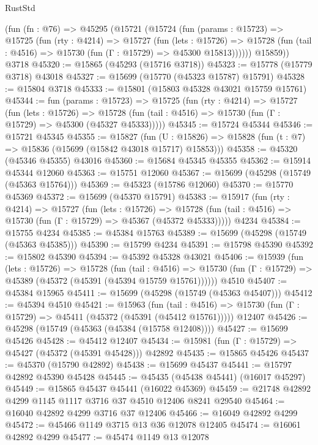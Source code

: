 \begin{lexlean}{RustStd}
\begin{coremodule}
    (fun (fn : @76) =>
    @45295
      (@15721
        (@15724
          (fun (params : @15723) =>
          @15725
            (fun (rty : @4214) =>
            @15727
              (fun (lets : @15726) =>
              @15728 (fun (tail : @4516) => @15730 (fun (Γ : @15729) => @45300 @15813))))))
        @15859))
    @3718
@45320 := @15865 (@45293 (@15716 @3718))
@45323 := @15778 (@15779 @3718) @43018
@45327 := @15699 (@15770 (@45323 @15787) @15791)
@45328 := @15804 @3718
@45333 := @15801 (@15803 @45328 @43021 @15759 @15761)
@45344 := fun (params : @15723) =>
  @15725
    (fun (rty : @4214) =>
    @15727
      (fun (lets : @15726) =>
      @15728 (fun (tail : @4516) => @15730 (fun (Γ : @15729) => @45300 (@45327 @45333)))))
@45345 := @15724 @45344
@45346 := @15721 @45345
@45355 := @15827
    (fun (U : @15826) => @15828 (fun (t : @7) => @15836 (@15699 (@15842 @43018 @15717) @15853)))
@45358 := @45320 (@45346 @45355) @43016
@45360 := @15684 @45345 @45355
@45362 := @15914 @45344 @12060
@45363 := @15751 @12060
@45367 := @15699 (@45298 (@15749 (@45363 @15764)))
@45369 := @45323 (@15786 @12060)
@45370 := @15770 @45369
@45372 := @15699 (@45370 @15791)
@45383 := @15917
    (fun (rty : @4214) =>
    @15727
      (fun (lets : @15726) =>
      @15728 (fun (tail : @4516) => @15730 (fun (Γ : @15729) => @45367 (@45372 @45333)))))
    @4234
@45384 := @15755 @4234
@45385 := @45384 @15763
@45389 := @15699 (@45298 (@15749 (@45363 @45385)))
@45390 := @15799 @4234
@45391 := @15798 @45390
@45392 := @15802 @45390
@45394 := @45392 @45328 @43021
@45406 := @15939
    (fun (lets : @15726) =>
    @15728
      (fun (tail : @4516) =>
      @15730 (fun (Γ : @15729) => @45389 (@45372 (@45391 (@45394 @15759 @15761))))))
    @4510
@45407 := @45384 @15965
@45411 := @15699 (@45298 (@15749 (@45363 @45407)))
@45412 := @45394 @4510
@45421 := @15963
    (fun (tail : @4516) => @15730 (fun (Γ : @15729) => @45411 (@45372 (@45391 (@45412 @15761)))))
    @12407
@45426 := @45298 (@15749 (@45363 (@45384 (@15758 @12408))))
@45427 := @15699 @45426
@45428 := @45412 @12407
@45434 := @15981 (fun (Γ : @15729) => @45427 (@45372 (@45391 @45428))) @42892
@45435 := @15865 @45426
@45437 := @45370 (@15790 @42892)
@45438 := @15699 @45437
@45441 := @15797 @42892 @45390 @45428
@45445 := @45435 (@45438 @45441) (@16017 @45297)
@45449 := @15865 @45437 @45441 (@16022 @45369)
@45459 := @21748 @42892 @4299 @1145 @1117 @3716 @37 @4510 @12406 @8241 @29540
@45464 := @16040 @42892 @4299 @3716 @37 @12406
@45466 := @16049 @42892 @4299
@45472 := @45466 @1149 @3715 @13 @36 @12078 @12405
@45474 := @16061 @42892 @4299
@45477 := @45474 @1149 @13 @12078

\end{coremodule}
\end{lexlean}
